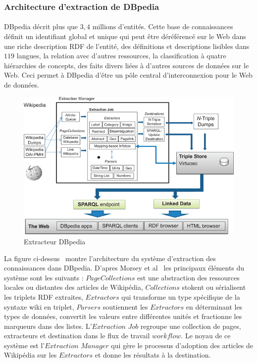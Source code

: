 \subsubsection{Architecture d'extraction de DBpedia}
\paragraph{}
DBpedia décrit plus que $3,4$ millions d'entités. Cette base de connaissances définit un identifiant global et unique qui peut être déréférencé sur le Web dans une riche description RDF de l'entité, des définitions et descriptions lisibles dans $119$ langues, la relation avec d'autres ressources, la classification à quatre hiérarchies de concepts, des faits divers liées à d'autres sources de données sur le Web. Ceci permet à DBpedia d'être un pôle central d'interconnexion pour le Web de données.   
\begin{figure}[H]
\centering
\includegraphics[width=12cm]{dbpediaExtra.png}
\caption{Extracteur DBpedia}
\end{figure}
La figure ci-dessus~\cite{morsey2012} montre l'architecture du système d'extraction des connaissances dans DBpedia.
D'apres Morsey et al~\cite{morsey2012} les principaux éléments du système sont les suivants : $PageCollections$ est une abstraction des ressources locales ou distantes des articles de Wikipédia, $Collections$ stokent ou sérialisent les triplets RDF extraites, $Extractors$ qui transforme un type spécifique de la syntaxe wiki en triplet, $Parsers$ soutiennent les $Extractors$ en déterminant les types de données, convertit les valeurs entre différentes unités et fractionne les marqueurs dans des listes. L'$Extraction$ $Job$ regroupe une collection de pages, extracteurs et destination dans le flux de travail $workflow$.
Le noyau de ce système est l'$Extraction$ $Manager$ qui gère le processus  d'adoption des articles de Wikipédia sur les $Extractors$ et donne les résultats à la destination.
